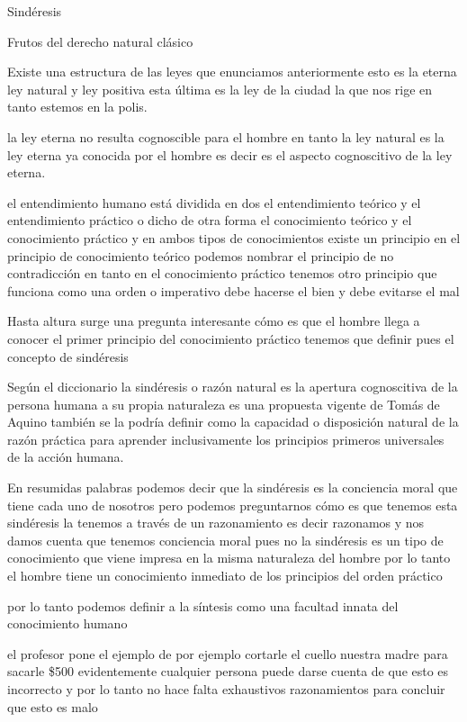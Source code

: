 \documentclass[12pt]{book}
\begin{document}
Sindéresis


Frutos del derecho natural clásico

Existe una estructura de las leyes que enunciamos anteriormente esto es la eterna ley natural y ley positiva esta última es la ley de la ciudad la que nos rige en tanto estemos en la polis.

la ley eterna no resulta cognoscible para el hombre en tanto la ley natural es la ley eterna ya conocida por el hombre es decir es el aspecto cognoscitivo de la ley eterna.

el entendimiento humano está dividida en dos el entendimiento teórico y el entendimiento práctico o dicho de otra forma el conocimiento teórico y el conocimiento práctico y en ambos tipos de conocimientos existe un principio en el principio de conocimiento teórico podemos nombrar el principio de no contradicción en tanto en el conocimiento práctico tenemos otro principio que funciona como una orden o imperativo debe hacerse el bien y debe evitarse el mal

Hasta altura surge una pregunta interesante cómo es que el hombre llega a conocer el primer principio del conocimiento práctico tenemos que definir pues el concepto de sindéresis


Según el diccionario la sindéresis o razón natural es la apertura cognoscitiva de la persona humana a su propia naturaleza es una propuesta vigente de Tomás de Aquino también se la podría definir como la capacidad o disposición natural de la razón práctica para aprender inclusivamente los principios primeros universales de la acción humana.

En resumidas palabras podemos decir que la sindéresis es la conciencia moral que tiene cada uno de nosotros pero podemos preguntarnos cómo es que tenemos esta sindéresis la tenemos a través de un razonamiento es decir razonamos y nos damos cuenta que tenemos conciencia moral pues no la sindéresis es un tipo de conocimiento que viene impresa en la misma naturaleza del hombre por lo tanto el hombre tiene un conocimiento inmediato de los principios del orden práctico

por lo tanto podemos definir a la síntesis como una facultad innata del conocimiento humano

el profesor pone el ejemplo de por ejemplo cortarle el cuello nuestra madre para sacarle \$500 evidentemente cualquier persona puede darse cuenta de que esto es incorrecto y por lo tanto no hace falta exhaustivos razonamientos para concluir que esto es malo
\end{document}
